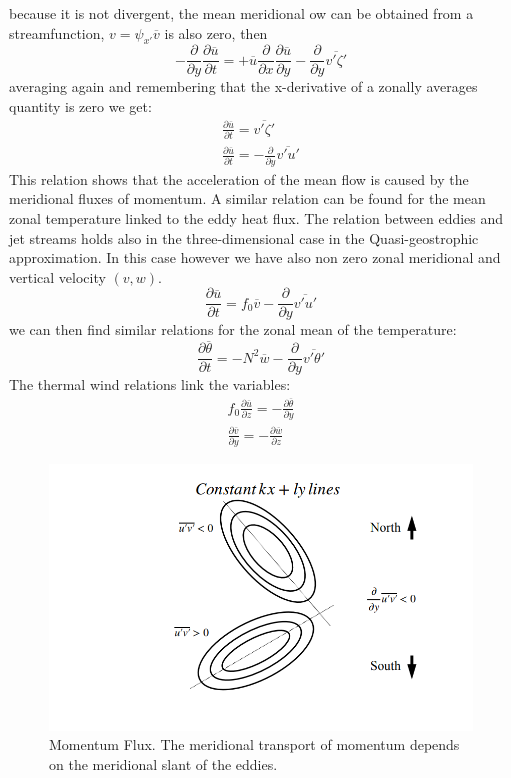because it is not divergent, the mean meridional ow can be obtained from a streamfunction, $v=\psi_{x'}\overline{v}$ is also zero, then
$$-\frac{\partial}{\partial y}\frac{\partial\overline{u}}{\partial t}=+\overline{u}\frac{\partial}{\partial x}\frac{\partial\overline{u}}{\partial y}-\frac{\partial}{\partial y}\overline{v'\zeta'}$$
averaging again and remembering that the x-derivative of a zonally averages quantity is zero we get:
\begin{align*}
	\frac{\partial\overline{u}}{\partial t}=\overline{v'\zeta'} \\
	\frac{\partial\overline{u}}{\partial t}=-\frac{\partial}{\partial y}\overline{v'u'}
\end{align*}
This relation shows that the acceleration of the mean flow is caused by the meridional fluxes of momentum. A similar relation can be found for the mean zonal temperature linked to the eddy heat flux. The relation between eddies and jet streams holds also in the three-dimensional case in the Quasi-geostrophic approximation. In this case however we have also non zero
zonal meridional and vertical velocity $(v,w)$.
$$\frac{\partial\overline{u}}{\partial t}=f_0\overline{v}-\frac{\partial}{\partial y}\overline{v'u'}$$
we can then find similar relations for the zonal mean of the temperature:
\begin{equation}\label{eq.zonal mean of temperature}
	\frac{\partial\overline{\theta}}{\partial t}=-N^2\overline{w}-\frac{\partial}{\partial y}\overline{v'\theta'}
\end{equation}
The thermal wind relations link the variables:
\begin{align}\label{eq.thermal wind}
	f_0\frac{\partial\overline{u}}{\partial z}=-\frac{\partial\overline{\theta}}{\partial y} \\
	\frac{\partial\overline{v}}{\partial y}=-\frac{\partial\overline{w}}{\partial z}
\end{align}
\begin{figure}[htp!]
	\centering
	\includegraphics[width=0.5\linewidth]{uploads/Screenshot 2024-11-22 202457.png}
	\caption{Momentum Flux. The meridional transport of momentum depends on the meridional slant of the eddies.}
	\label{fig:enter-label}
\end{figure}

